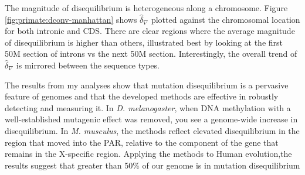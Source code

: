 The magnitude of disequilibrium is heterogeneous along a chromosome. Figure \ref{fig:primate:dconv-manhattan} shows $\hat \delta_\nabla$ plotted against the chromosomal location for both intronic and CDS. There are clear regions where the average magnitude of disequilibrium is higher than others, illustrated best by looking at the first 50M section of introns vs the next 50M section. Interestingly, the overall trend of $\hat \delta_\nabla$ is mirrored between the sequence types. 



The results from my analyses show that mutation disequilibrium is a pervasive feature of genomes and that the developed methods are effective in robustly detecting and measuring it. In \textit{D. melanogaster}, when DNA methylation with a well-established mutagenic effect was removed, you see a genome-wide increase in disequilibrium. In \textit{M. musculus}, the methods reflect elevated disequilibrium in the region that moved into the PAR, relative to the component of the gene that remains in the X-specific region. Applying the methods to Human evolution,the results suggest that greater than 50\% of our genome is in mutation disequilibrium